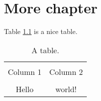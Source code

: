 \chapter{More chapter}
Table \ref{table:mytable} is a nice table.

\begin{table}[h]
  \centering
  \begin{tabular}{cc}
    \toprule \\
    Column 1 & Column 2 \\
    \midrule \\
    Hello & world! \\
    \bottomrule
  \end{tabular}
  \caption{A table.}
  \label{table:mytable}
\end{table}

